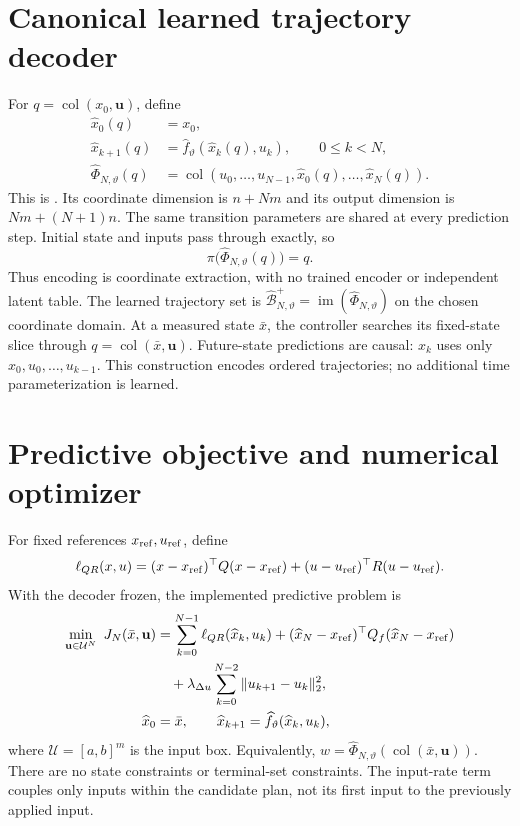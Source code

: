 \documentclass[11pt]{article}
\newcommand{\col}{\operatorname{col}}
\newcommand{\code}[1]{\texttt{\detokenize{#1}}}
\begin{document}
\section{Canonical learned trajectory decoder}
For $q=\col(x_0,\mathbf u)$, define
\begin{align}
\widehat x_0(q)&=x_0,\label{eq:initial}\\
\widehat x_{k+1}(q)&=\widehat f_\vartheta(\widehat x_k(q),u_k),\qquad 0\leq k<N,\label{eq:rollout}\\
\widehat\Phi_{N,\vartheta}(q)&=\col(u_0,\ldots,u_{N-1},\widehat x_0(q),\ldots,\widehat x_N(q)).\label{eq:decoder}
\end{align}
This is \code{CanonicalBehaviorDecoder}. Its coordinate dimension is $n+Nm$ and its output dimension is $Nm+(N+1)n$. The same transition parameters are shared at every prediction step. Initial state and inputs pass through exactly, so
\begin{equation}\label{eq:projection}
\pi\bigl(\widehat\Phi_{N,\vartheta}(q)\bigr)=q.
\end{equation}
Thus encoding is coordinate extraction, with no trained encoder or independent latent table. The learned trajectory set is $\widehat{\mathcal B}_{N,\vartheta}^+=\operatorname{im}(\widehat\Phi_{N,\vartheta})$ on the chosen coordinate domain. At a measured state $\bar x$, the controller searches its fixed-state slice through $q=\col(\bar x,\mathbf u)$. Future-state predictions are causal: $\widehat x_k$ uses only $x_0,u_0,\ldots,u_{k-1}$. This construction encodes ordered trajectories; no additional time parameterization is learned.

\section{Predictive objective and numerical optimizer}
For fixed references $x_{\rm ref},u_{\rm ref}$, define
\begin{equation}\label{eq:stage}
\ell_{QR}(x,u)=(x-x_{\rm ref})^\top Q(x-x_{\rm ref})+(u-u_{\rm ref})^\top R(u-u_{\rm ref}).
\end{equation}
With the decoder frozen, the implemented predictive problem is
\begin{equation}\label{eq:mpc}
\begin{aligned}
\min_{\mathbf u\in\mathcal U^N}\ J_N(\bar x,\mathbf u)
&=\sum_{k=0}^{N-1}\ell_{QR}(\widehat x_k,u_k)
 +(\widehat x_N-x_{\rm ref})^\top Q_f(\widehat x_N-x_{\rm ref})\\
&\quad+\lambda_{\Delta u}\sum_{k=0}^{N-2}\|u_{k+1}-u_k\|_2^2,\\
\widehat x_0&=\bar x,\qquad \widehat x_{k+1}=\widehat f_\vartheta(\widehat x_k,u_k),
\end{aligned}
\end{equation}
where $\mathcal U=[a,b]^m$ is the input box. Equivalently, $w=\widehat\Phi_{N,\vartheta}(\col(\bar x,\mathbf u))$. There are no state constraints or terminal-set constraints. The input-rate term couples only inputs within the candidate plan, not its first input to the previously applied input.
\end{document}
